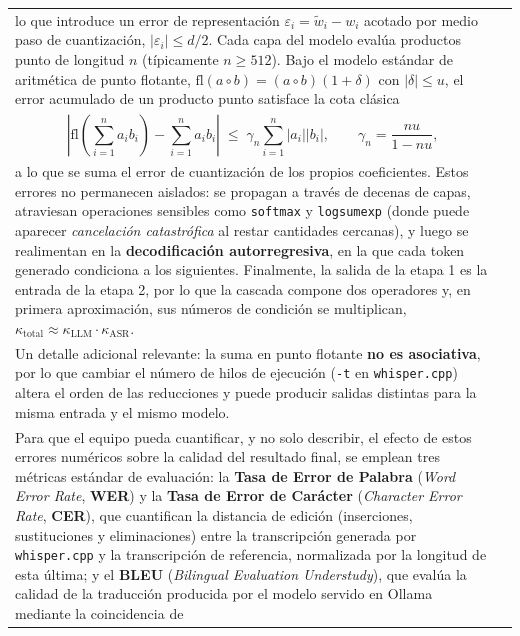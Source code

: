 \documentclass[12pt]{article}
\begin{document}
\begin{longtable}{|p{\textwidth}|@{}c@{}}
  lo que introduce un error de representación $\varepsilon_i=\tilde{w}_i-w_i$ acotado por medio paso de
  cuantización, $|\varepsilon_i|\le d/2$. Cada capa del modelo evalúa productos punto de longitud $n$
  (típicamente $n\ge 512$). Bajo el modelo estándar de aritmética de punto flotante,
  $\mathrm{fl}(a\circ b)=(a\circ b)(1+\delta)$ con $|\delta|\le u$, el error acumulado de un producto punto
  satisface la cota clásica&\\
  \vspace{-4pt}
  \[
  \left|\mathrm{fl}\!\left(\sum_{i=1}^{n} a_i b_i\right)-\sum_{i=1}^{n} a_i b_i\right|
  \;\le\; \gamma_n \sum_{i=1}^{n}|a_i||b_i|,
  \qquad \gamma_n=\frac{nu}{1-nu},
  \]
  \vspace{-14pt}&\\
  a lo que se suma el error de cuantización de los propios coeficientes. Estos errores no permanecen
  aislados: se propagan a través de decenas de capas, atraviesan operaciones sensibles como
  \texttt{softmax} y \texttt{logsumexp} (donde puede aparecer \textit{cancelación catastrófica} al restar
  cantidades cercanas), y luego se realimentan en la \textbf{decodificación autorregresiva}, en la que cada
  token generado condiciona a los siguientes. Finalmente, la salida de la etapa 1 es la entrada de la
  etapa 2, por lo que la cascada compone dos operadores y, en primera aproximación, sus números de
  condición se multiplican, $\kappa_{\text{total}} \approx \kappa_{\text{LLM}}\cdot\kappa_{\text{ASR}}$.&\\
  Un detalle adicional relevante: la suma en punto flotante \textbf{no es asociativa}, por lo que cambiar el
  número de hilos de ejecución (\texttt{-t} en \texttt{whisper.cpp}) altera el orden de las reducciones y puede
  producir salidas distintas para la misma entrada y el mismo modelo.&\\
  Para que el equipo pueda cuantificar, y no solo describir, el efecto de estos errores numéricos sobre la
  calidad del resultado final, se emplean tres métricas estándar de evaluación: la \textbf{Tasa de Error de
  Palabra} (\textit{Word Error Rate}, \textbf{WER}) y la \textbf{Tasa de Error de Carácter} (\textit{Character
  Error Rate}, \textbf{CER}), que cuantifican la distancia de edición (inserciones, sustituciones y
  eliminaciones) entre la transcripción generada por \texttt{whisper.cpp} y la transcripción de referencia,
  normalizada por la longitud de esta última; y el \textbf{BLEU} (\textit{Bilingual Evaluation Understudy}),
  que evalúa la calidad de la traducción producida por el modelo servido en Ollama mediante la coincidencia de

\end{longtable}
\end{document}
